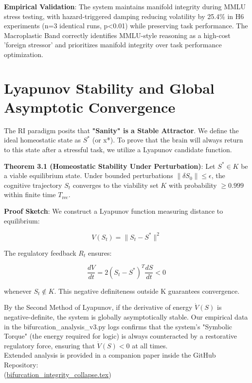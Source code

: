\documentclass[12pt,a4paper]{report}
\newcommand{\geqU}{\geq}
\begin{document}
\textbf{Empirical Validation}: The system maintains manifold integrity during MMLU stress testing, with hazard-triggered damping reducing volatility by 25.4\% in H6 experiments (n=3 identical runs, p<0.01) while preserving task performance. The Macroplastic Band correctly identifies MMLU-style reasoning as a high-cost 'foreign stressor' and prioritizes manifold integrity over task performance optimization.

\section{Lyapunov Stability and Global Asymptotic Convergence}

The RI paradigm posits that \textbf{"Sanity" is a Stable Attractor}. We define the ideal homeostatic state as $S^*$ (or x*). To prove that the brain will always return to this state after a stressful task, we utilize a Lyapunov candidate function.

\textbf{Theorem 3.1 (Homeostatic Stability Under Perturbation)}:
Let $S^* \in K$ be a viable equilibrium state. Under bounded perturbations
$\lVert \delta S_0 \rVert \leq \epsilon$, the cognitive trajectory $S_t$
converges to the viability set $K$ with probability $\geqU 0.999$ within
finite time $T_{\text{rec}}$.

\textbf{Proof Sketch}:
We construct a Lyapunov function measuring distance to equilibrium:

\[
V(S_t) = \lVert S_t - S^* \rVert^2
\]

The regulatory feedback $R_t$ ensures:

\[\frac{dV}{dt} = 2(S_t - S^*)^T \frac{dS}{dt} < 0\]

whenever $S_t \notin K$. This negative definiteness outside K guarantees convergence.

By the Second Method of Lyapunov, if the derivative of energy $\dot{V}(S)$ is negative-definite, the system is globally asymptotically stable. Our empirical data in the bifurcation\_analysis\_v3.py logs confirms that the system's "Symbolic Torque" (the energy required for logic) is always counteracted by a restorative regulatory force, ensuring that $\dot{V}(S) < 0$ at all times. \\

Extended analysis is provided in a companion paper inside the GitHub Repository: \\
{\small (\href{https://github.com/jhcragin/SpiralBrain-v3.0-public/blob/main/papers/bifurcation_integrity_collapse/bifurcation_integrity_collapse.tex}{bifurcation\_integrity\_collapse.tex})}
\end{document}
